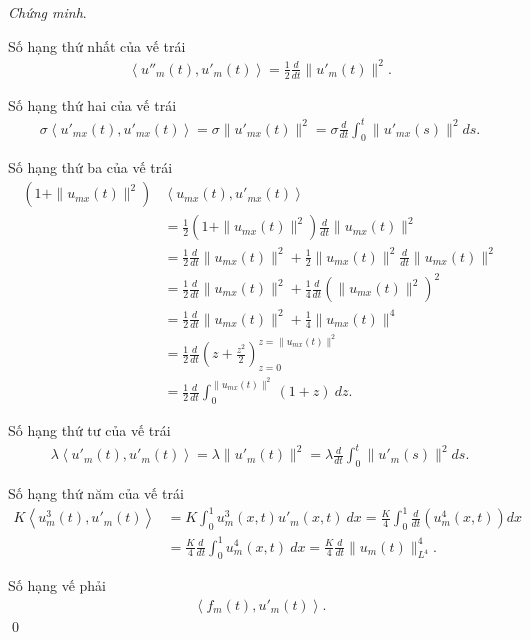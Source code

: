 \documentclass[12pt,a4paper]{article}
\theoremstyle{definition}
\begin{document}
\textit{Chứng minh}.

Số hạng thứ nhất của vế trái
\begin{align*}
    \left<u''_m(t),u'_m(t)\right> = \frac{1}{2} \frac{d}{dt} \|u'_m(t)\|^2.
\end{align*}

Số hạng thứ hai của vế trái
\begin{align*}
    \sigma \left<u'_{mx}(t), u'_{mx}(t)\right> = \sigma \|u'_{mx}(t)\|^2 = \sigma \frac{d}{dt} \int_0^t \|u'_{mx}(s)\|^2 ds.
\end{align*}

Số hạng thứ ba của vế trái
\begin{align*}
    \left(1 + \|u_{mx}(t)\|^2\right) &\left<u_{mx}(t), u'_{mx}(t)\right> \\
    &= \frac{1}{2} \left(1 + \|u_{mx}(t)\|^2\right) \frac{d}{dt} \|u_{mx}(t)\|^2 \\
    &= \frac{1}{2} \frac{d}{dt} \|u_{mx}(t)\|^2 + \frac{1}{2} \|u_{mx}(t)\|^2 \frac{d}{dt} \|u_{mx}(t)\|^2 \\
    &= \frac{1}{2} \frac{d}{dt} \|u_{mx}(t)\|^2 + \frac{1}{4} \frac{d}{dt} \left(\|u_{mx}(t)\|^2\right)^2 \\
    &= \frac{1}{2} \frac{d}{dt} \|u_{mx}(t)\|^2 + \frac{1}{4} \|u_{mx}(t)\|^4 \\
    &= \frac{1}{2} \frac{d}{dt} \left(z + \frac{z^2}{2}\right)_{z=0}^{z=\|u_{mx}(t)\|^2} \\
    &= \frac{1}{2} \frac{d}{dt} \int_0^{\|u_{mx}(t)\|^2} (1+z)\:dz.
\end{align*}

Số hạng thứ tư của vế trái
\begin{align*}
    \lambda \left<u'_m(t),u'_m(t)\right> = \lambda \|u'_m(t)\|^2 = \lambda \frac{d}{dt} \int_0^t \|u'_m(s)\|^2 ds.
\end{align*}

Số hạng thứ năm của vế trái
\begin{align*}
    K \left<u^3_m(t),u'_m(t)\right>
    &= K \int_0^1 u^3_m(x,t) u'_m(x,t)\:dx
    = \frac{K}{4} \int_0^1 \frac{d}{dt}\left(u^4_m(x,t)\right)dx \\
    &= \frac{K}{4} \frac{d}{dt} \int_0^1 u^4_m(x,t)\:dx
    = \frac{K}{4} \frac{d}{dt} \|u_m(t)\|^4_{L^4}.
\end{align*}

Số hạng vế phải
\begin{align*}
    \left<f_m(t), u'_m(t)\right>.
\end{align*} \qed
\end{document}
